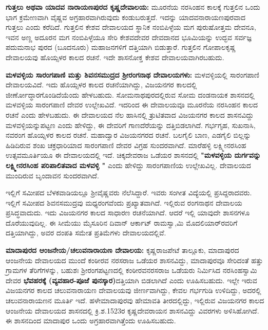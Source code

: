\vskip 3pt

\textbf{ಗುತ್ತಲು ಅಥವಾ ಯಾದವ ನಾರಾಯಣಪುರದ ಕೃಷ್ಣದೇವಾಲಯ:} ಮೂರನೆಯ ನರಸಿಂಹನ ಕಾಲಕ್ಕೆ ಗುತ್ತಲಿನ ಒಂದು ಭಾಗ ಕ್ರಮೇಣವಾಗಿ ವೈಷ್ಣವ ಅಗ್ರಹಾರವಾಗಿರುವುದು ಕಂಡುಬರುತ್ತದೆ. ಇದನ್ನು ಯಾದವನಾರಾಯಣಪುರವಾದ ಗುತ್ತಲು ಎಂದು ಕರೆದಿದೆ. ಗುತ್ತಲಿನ ಕೇಶವ ದೇವಾಲಯದ ಸ್ಥಾನಿಕ ನಂಬಿಪಿಳ್ಳೆಯ ಮಗ ಪುರುಷೋತ್ತಮ ದೇವನೂ, ಇವನ ಅಣ್ಣ ಅದೂರನ ಮಗ ನಂಬಿಪಿಳ್ಳೆಯೂ ಸೇರಿ ಕೇಶವದೇವರ ದೇವದಾನದ ಭೂಮಿಯನ್ನು ಉದ್ಭವ ಸರ್ವಜ್ಞ ಪದುಮನಾಭ ಪುರದ (ಬೂದನೂರು) ಮಹಾಜನಗಳಿಗೆ ದತ್ತಿಯಾಗಿ ಬಿಡುತ್ತಾರೆ. ಗುತ್ತಲಿನ ಗೋಪಾಲಕೃಷ್ಣ ದೇವಾಲಯವು ಹೊಯ್ಸಳರ ಕಾಲದ ರಚನೆ. ಇದೇ ಶಾಸನೋಕ್ತ ಕೇಶವ ದೇವಾಲಯವಾಗಿರಬಹುದು.

\vskip 3pt

\textbf{ಮಳವಳ್ಳಿಯ ಸಾರಂಗಪಾಣಿ ಮತ್ತು ಶಿವನಸಮುದ್ರದ ಶ‍್ರೀರಂಗನಾಥ ದೇವಾಲಯಗಳು:} ಮಳವಳ್ಳಿಯಲ್ಲಿ ಸಾರಂಗಪಾಣಿ ದೇವಾಲಯವಿದೆ. ಇದು ಹೊಯ್ಸಳರ ಕಾಲದ ರಚನೆಯಾಗಿದ್ದು, ವಿಜಯನಗರ ಕಾಲದಲ್ಲಿ ಜೀರ್ಣೋದ್ಧಾರ\-ಗೊಂಡಿದೆಯೆಂದು ಹೇಳಬಹುದು. ಸೋಮನಾಥಪುರದಲ್ಲಿರುವ ಸೋಮ ದಂಡನಾಯಕ ಶಾಸನದಲ್ಲಿ ಮಳವಳ್ಳಿಯ ಸಾರಂಗಪಾಣಿ ದೇವರ ಉಲ್ಲೇಖವಿದೆ. ಇದರಿಂದ ಈ ದೇವಾಲಯವೂ ಮೂರನೆಯ ನರಸಿಂಹನ ಕಾಲದ ರಚನೆ ಎಂದು ಹೇಳಬಹುದು. ಈ ದೇವಾಲಯದ ನೆಲ ಹಾಸಿನಲ್ಲಿ ತ್ರುಟಿತವಾದ ವಿಜಯನಗರ ಕಾಲದ ಶಾಸನವಿದ್ದು ಮಳವಳ್ಳಿಯನ್ನು\break ಪಟ್ಟಣ ಎಂದು ಹೇಳಿದ್ದು, ಈ ದೇವರಿಗೆ ಗಾಣದೆರೆಯನ್ನು ದತ್ತಿಬಿಡಲಾಗಿದೆ. ಗರ್ಭಗೃಹ, ಸುಖನಾಸಿ, ನವರಂಗ ಹೊಯ್ಸಳರ ಕಾಲದ ರಚನೆ. ಮಹಾದ್ವಾರ ವಿಜಯನಗರದ ರಚನೆ. ಬಲಗೈಲಿ ಬಾಣ, ಎಡಗೈಲಿ ಬಿಲ್ಲನ್ನು ಹಿಡಿದಿರುವ ಶಂಖ ಚಕ್ರಧಾರಿಯಾದ ಸಾರಂಗಪಾಣಿ ದೇವರ ವಿಗ್ರಹ ಸುಂದರವಾಗಿದೆ. ಮಾರೆಹಳ್ಳಿ ಲಕ್ಷ್ಮೀನರಸಿಂಹ ಉತ್ಸವಮೂರ್ತಿಯೂ ಈ ದೇವಾಲಯದಲ್ಲಿ ಇದೆ. ಚಿಕ್ಕದೇವರಾಜ ಒಡೆಯರ ಶಾಸನದಲ್ಲಿ \textbf{"ಮಳವಳ್ಳಿಯ ದುರ್ಗವನ್ನು ಲಕ್ಷ್ಮೀನರಸಿಂಹ ಪರಿಪಾಲಿತವಾದ ಮಳವಳ್ಳಿ "} ಎಂದು ಹೇಳಿದ್ದು ಸಾರಂಗಪಾಣಿಯ ಉಲ್ಲೇಖವಿಲ್ಲ. ದೇವಾಲಯದ ಮುಂದಿರುವ ಬೃಂದಾವನ ಸುಂದರವಾಗಿದೆ.

\vskip 3pt

ಇಲ್ಲಿಗೆ ಸಮೀಪದ ಬೆಳಕವಾಡಿಯಲ್ಲೂ ಶ‍್ರೀವೈಷ್ಣವರು ನೆಲೆಸಿದ್ದಾರೆ. ಇವರು ಸಂಗೀತ ವಿದ್ಯೆಯಲ್ಲಿ ಪ್ರಸಿದ್ದರಾದ\-ವರು. ಇಲ್ಲಿಗೆ ಸಮೀಪದ ಶಿವನಸಮುದ್ರವು ಮಧ್ಯರಂಗವೆಂದು ಪ್ರಖ್ಯಾತವಾಗಿದೆ. ಇಲ್ಲಿರುವ ರಂಗನಾಥನ ದೇವಾಲಯ ಪ್ರಸಿದ್ಧವಾದುದು. ಇದು ವಿಜಯನಗರ ಕಾಲದ ಸಾಧಾರಣ ರಚನೆಯಾಗಿದೆ. ಆದರೆ ಇಲ್ಲಿ ಯಾವುದೇ ಶಾಸನಗಳೂ ದೊರೆಯುವುದಿಲ್ಲ. ಈ ಸೀಮೆಯು ಮೈಸೂರಿನ ದಿವಾನ್​ ಆರ್ಕಾಟ್​ ರಾಮಸ್ವಾ,ಮಿ ಮೊದಲಿಯಾರ್​ರವರಿಗೆ ದತ್ತಿಯಾಗಿದ್ದು, ಅವರ ದಂಪತಿ ಸಮೇತ ಪ್ರತಿಮೆಗಳು ದೇವಾಲಯದಲ್ಲಿವೆ.

\newpage

\textbf{ಮಾದಾಪುರದ ಆಂಜನೇಯ/ಚಲುವನಾರಾಯಣ ದೇವಾಲಯ:} ಕೃಷ್ಣರಾಜಪೇಟೆ ತಾಲ್ಲೂಕು, ಮಾದಾಪುರದ ಆಂಜನೇಯ ದೇವಾಲಯದ ಮುಂದೆ ಕಂಠೀರವ ನರಸರಾಜ ಒಡೆಯರ ಶಾಸನವಿದ್ದು, ಮಾದಾಪುರವೂ ಸೇರಿದಂತೆ ಹತ್ತು ಗ್ರಾಮಗಳ ತೆರಿಗೆಗಳನ್ನು, ಬಹುಶಃ ಶ‍್ರೀರಂಗಪಟ್ಟಣದಲ್ಲಿ ಕಂಠೀರವನರಸರಾಜ ಒಡೆಯರು ನಿರ್ಮಿಸಿದ ನರಸಿಂಹಸ್ವಾಮಿ ದೇವರ \textbf{ಭೆವಹರಕ್ಕೆ (ವ್ಯವಹಾರ-ಪೂಜೆ ಪುನಸ್ಕಾರ)}ದತ್ತಿಯಾಗಿ ಬಿಡಲಾಗಿದೆ ಎಂದು ಊಹಿಸಬಹುದು. ಇಲ್ಲೇ ಇರುವ ವಿಜಯನಗರ ಕಾಲದ ಚಲುವನಾರಾಯಣ ದೇವಾಲಯವು ಜೀರ್ಣವಾಗಿದ್ದು, ಕೇವಲ ಗರ್ಭಗುಡಿ ಉಳಿದಿದ್ದು, ಅದರಲ್ಲಿ ಚಲುವನಾರಾಯಣನ ಮೂರ್ತಿ ಇದೆ. ಹಳೇಮಾದಾಪುರವು ಹೇಮಾವತಿ ತೀರದಲ್ಲಿದ್ದು, ಇಲ್ಲಿರುವ ವಿಜಯನಗರ ಕಾಲದ ಆಂಜನೇಯ ದೇವಾಲಯದ ಶಾಸನದಲ್ಲಿ ಕ್ರಿ.ಶ.1523ರ ಕೃಷ್ಣದೇವರಾಯನ ಶಾಸನವಿದ್ದು ವಿವರಗಳು ಅಳಿಸಿಹೋಗಿದೆ. ಈ ಶಾಸನದಿಂದ ಮಾದಾಪುರ ಒಂದು ಅಗ್ರಹಾರವಾಗಿತ್ತೆಂದು ಊಹಿಸಬಹುದು.

